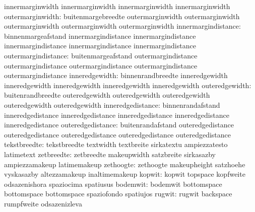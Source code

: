                      innermarginwidth    innermarginwidth
                     innermarginwidth    innermarginwidth
 outermarginwidth:   buitenmargebreedte  outermarginwidth
                     outermarginwidth    outermarginwidth
                     outermarginwidth    outermarginwidth
innermargindistance: binnenmargeafstand  innermargindistance
                     innermargindistance innermargindistance
                     innermargindistance innermargindistance
outermargindistance: buitenmargeafstand  outermargindistance
                     outermargindistance outermargindistance
                     outermargindistance outermargindistance
   inneredgewidth:   binnenrandbreedte  inneredgewidth
                     inneredgewidth     inneredgewidth
                     inneredgewidth     inneredgewidth
   outeredgewidth:   buitenrandbreedte  outeredgewidth
                     outeredgewidth     outeredgewidth
                     outeredgewidth     outeredgewidth
  inneredgedistance: binnenrandafstand  inneredgedistance
                     inneredgedistance  inneredgedistance
                     inneredgedistance  inneredgedistance
  outeredgedistance: buitenrandafstand  outeredgedistance
                     outeredgedistance  outeredgedistance
                     outeredgedistance  outeredgedistance
                    tekstbreedte: tekstbreedte                     textwidth
                                  textbreite                       sirkatextu
                                  ampiezzatesto                    latimetext
                      zetbreedte: zetbreedte                       makeupwidth
                                  satzbreite                       sirkasazby
                                  ampiezzamakeup                   latimemakeup %
                       zethoogte: zethoogte                        makeupheight
                                  satzhoehe                        vyskasazby
                                  altezzamakeup                    inaltimemakeup
                          kopwit: kopwit                           topspace
                                  kopfweite                        odsazenishora
                                  spaziocima                       spatiusus
                        bodemwit: bodemwit                         bottomspace
                                  bottomspace                      bottomspace
                                  spaziofondo                      spatiujos
                          rugwit: rugwit                           backspace
                                  rumpfweite                       odsazenizleva
